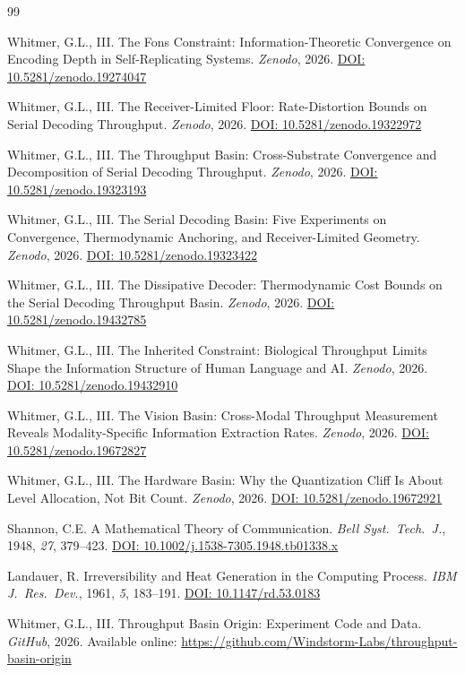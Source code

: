 \documentclass[11pt]{article}
\begin{document}
\begin{thebibliography}{99}

Whitmer, G.L., III.
The Fons Constraint: Information-Theoretic Convergence on Encoding Depth in Self-Replicating Systems.
\emph{Zenodo}, 2026.
\href{https://doi.org/10.5281/zenodo.19274047}{DOI: 10.5281/zenodo.19274047}

Whitmer, G.L., III.
The Receiver-Limited Floor: Rate-Distortion Bounds on Serial Decoding Throughput.
\emph{Zenodo}, 2026.
\href{https://doi.org/10.5281/zenodo.19322972}{DOI: 10.5281/zenodo.19322972}

Whitmer, G.L., III.
The Throughput Basin: Cross-Substrate Convergence and Decomposition of Serial Decoding Throughput.
\emph{Zenodo}, 2026.
\href{https://doi.org/10.5281/zenodo.19323193}{DOI: 10.5281/zenodo.19323193}

Whitmer, G.L., III.
The Serial Decoding Basin: Five Experiments on Convergence, Thermodynamic Anchoring, and Receiver-Limited Geometry.
\emph{Zenodo}, 2026.
\href{https://doi.org/10.5281/zenodo.19323422}{DOI: 10.5281/zenodo.19323422}

Whitmer, G.L., III.
The Dissipative Decoder: Thermodynamic Cost Bounds on the Serial Decoding Throughput Basin.
\emph{Zenodo}, 2026.
\href{https://doi.org/10.5281/zenodo.19432785}{DOI: 10.5281/zenodo.19432785}

Whitmer, G.L., III.
The Inherited Constraint: Biological Throughput Limits Shape the Information Structure of Human Language and AI.
\emph{Zenodo}, 2026.
\href{https://doi.org/10.5281/zenodo.19432910}{DOI: 10.5281/zenodo.19432910}

Whitmer, G.L., III.
The Vision Basin: Cross-Modal Throughput Measurement Reveals Modality-Specific Information Extraction Rates.
\emph{Zenodo}, 2026.
\href{https://doi.org/10.5281/zenodo.19672827}{DOI: 10.5281/zenodo.19672827}

Whitmer, G.L., III.
The Hardware Basin: Why the Quantization Cliff Is About Level Allocation, Not Bit Count.
\emph{Zenodo}, 2026.
\href{https://doi.org/10.5281/zenodo.19672921}{DOI: 10.5281/zenodo.19672921}

Shannon, C.E.
A Mathematical Theory of Communication.
\emph{Bell Syst.\ Tech.\ J.}, 1948, \emph{27}, 379--423.
\href{https://doi.org/10.1002/j.1538-7305.1948.tb01338.x}{DOI: 10.1002/j.1538-7305.1948.tb01338.x}

Landauer, R.
Irreversibility and Heat Generation in the Computing Process.
\emph{IBM J.\ Res.\ Dev.}, 1961, \emph{5}, 183--191.
\href{https://doi.org/10.1147/rd.53.0183}{DOI: 10.1147/rd.53.0183}

Whitmer, G.L., III.
Throughput Basin Origin: Experiment Code and Data.
\emph{GitHub}, 2026.
Available online: \url{https://github.com/Windstorm-Labs/throughput-basin-origin}

\end{thebibliography}
\end{document}
